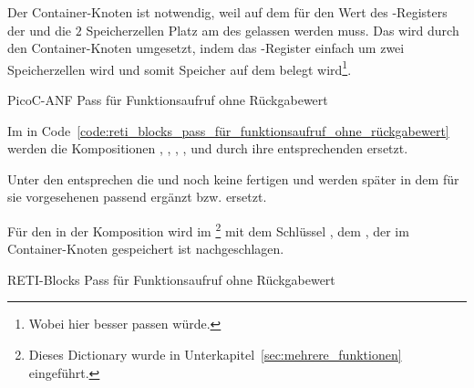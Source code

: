 Der Container-Knoten  ist notwendig, weil auf dem  für den Wert des -Registers der  und die  $2$ Speicherzellen Platz am  des  gelassen werden muss. Das wird durch den Container-Knoten  umgesetzt, indem das -Register einfach um zwei Speicherzellen  wird und somit Speicher auf dem  belegt wird\footnote{Wobei hier \dq {}\dq besser passen würde.}.

\begin{code}
  \centering
  \caption{PicoC-ANF Pass für Funktionsaufruf ohne Rückgabewert}
  \label{code:picoc_mon_pass_für_funktionsaufruf_ohne_rückgabewert}
\end{code}

Im  in Code~\ref{code:reti_blocks_pass_für_funktionsaufruf_ohne_rückgabewert} werden die Kompositionen , , , ,  und  durch ihre entsprechenden  ersetzt.

Unter den  entsprechen die   und  noch keine fertigen  und werden später in dem für sie vorgesehenen  passend ergänzt bzw. ersetzt.

Für den    in der Komposition  wird im  \footnote{Dieses Dictionary wurde in Unterkapitel~\ref{sec:mehrere_funktionen} eingeführt.} mit dem Schlüssel , dem , der im Container-Knoten  gespeichert ist nachgeschlagen.

\begin{code}
  \centering
  \caption{RETI-Blocks Pass für Funktionsaufruf ohne Rückgabewert}
  \label{code:reti_blocks_pass_für_funktionsaufruf_ohne_rückgabewert}
\end{code}

